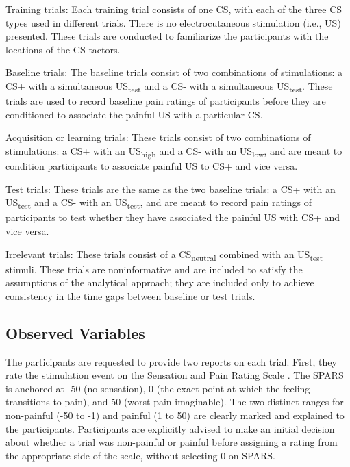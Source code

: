\documentclass[empirical,issue, twocolumn,authordate]{jote-new-article}
\begin{document}
Training trials: Each training trial consists of one CS, with each of the three CS types used in different trials. There is no electrocutaneous stimulation (i.e., US) presented. These trials are conducted to familiarize the participants with the locations of the CS tactors. 

Baseline trials: The baseline trials consist of two combinations of stimulations: a CS+ with a simultaneous US\textsubscript{test} and a CS- with a simultaneous US\textsubscript{test}. These trials are used to record baseline pain ratings of participants before they are conditioned to associate the painful US with a particular CS.

Acquisition or learning trials: These trials consist of two combinations of stimulations: a CS+ with an US\textsubscript{high} and a CS- with an US\textsubscript{low}, and are meant to condition participants to associate painful US to CS+ and vice versa.

Test trials: These trials are the same as the two baseline trials: a CS+ with an US\textsubscript{test} and a CS- with an US\textsubscript{test}, and are meant to record pain ratings of participants to test whether they have associated the painful US with CS+ and vice versa.

Irrelevant trials: These trials consist of a CS\textsubscript{neutral} combined with an US\textsubscript{test} stimuli. These trials are noninformative and are included to satisfy the assumptions of the analytical approach; they are included only to achieve consistency in the time gaps between baseline or test trials. 

\subsection{Observed Variables}

The participants are requested to provide two reports on each trial. First, they rate the stimulation event on the Sensation and Pain Rating Scale \parencite[SPARS; previously known as FESTNRS;][]{Madden2017, Madden2019}. The SPARS is anchored at -50 (no sensation), 0 (the exact point at which the feeling transitions to pain), and 50 (worst pain imaginable). The two distinct ranges for non-painful (-50 to -1) and painful (1 to 50) are clearly marked and explained to the participants. Participants are explicitly advised to make an initial decision about whether a trial was non-painful or painful before assigning a rating from the appropriate side of the scale, without selecting 0 on SPARS. 
\end{document}
